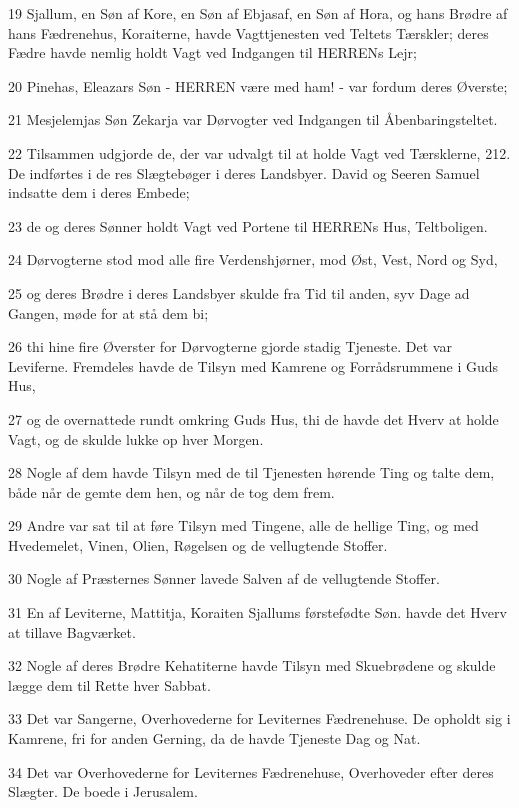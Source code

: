 \par 19 Sjallum, en Søn af Kore, en Søn af Ebjasaf, en Søn af Hora, og hans Brødre af hans Fædrenehus, Koraiterne, havde Vagttjenesten ved Teltets Tærskler; deres Fædre havde nemlig holdt Vagt ved Indgangen til HERRENs Lejr;
\par 20 Pinehas, Eleazars Søn - HERREN være med ham! - var fordum deres Øverste;
\par 21 Mesjelemjas Søn Zekarja var Dørvogter ved Indgangen til Åbenbaringsteltet.
\par 22 Tilsammen udgjorde de, der var udvalgt til at holde Vagt ved Tærsklerne, 212. De indførtes i de res Slægtebøger i deres Landsbyer. David og Seeren Samuel indsatte dem i deres Embede;
\par 23 de og deres Sønner holdt Vagt ved Portene til HERRENs Hus, Teltboligen.
\par 24 Dørvogterne stod mod alle fire Verdenshjørner, mod Øst, Vest, Nord og Syd,
\par 25 og deres Brødre i deres Landsbyer skulde fra Tid til anden, syv Dage ad Gangen, møde for at stå dem bi;
\par 26 thi hine fire Øverster for Dørvogterne gjorde stadig Tjeneste. Det var Leviferne. Fremdeles havde de Tilsyn med Kamrene og Forrådsrummene i Guds Hus,
\par 27 og de overnattede rundt omkring Guds Hus, thi de havde det Hverv at holde Vagt, og de skulde lukke op hver Morgen.
\par 28 Nogle af dem havde Tilsyn med de til Tjenesten hørende Ting og talte dem, både når de gemte dem hen, og når de tog dem frem.
\par 29 Andre var sat til at føre Tilsyn med Tingene, alle de hellige Ting, og med Hvedemelet, Vinen, Olien, Røgelsen og de vellugtende Stoffer.
\par 30 Nogle af Præsternes Sønner lavede Salven af de vellugtende Stoffer.
\par 31 En af Leviterne, Mattitja, Koraiten Sjallums førstefødte Søn. havde det Hverv at tillave Bagværket.
\par 32 Nogle af deres Brødre Kehatiterne havde Tilsyn med Skuebrødene og skulde lægge dem til Rette hver Sabbat.
\par 33 Det var Sangerne, Overhovederne for Leviternes Fædrenehuse. De opholdt sig i Kamrene, fri for anden Gerning, da de havde Tjeneste Dag og Nat.
\par 34 Det var Overhovederne for Leviternes Fædrenehuse, Overhoveder efter deres Slægter. De boede i Jerusalem.
